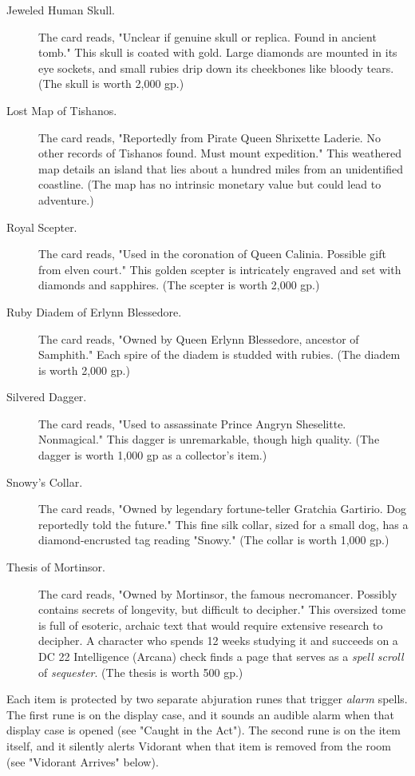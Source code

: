\documentclass[10pt,a4paper,twoside,bg=print,twocolumn,openany,nodeprecatedcode]{dndbook}
\begin{document}
\begin{description}
\item[Jeweled Human Skull.]
The card reads, "Unclear if genuine skull or replica. Found in ancient tomb." This skull is coated with gold. Large diamonds are mounted in its eye sockets, and small rubies drip down its cheekbones like bloody tears. (The skull is worth 2,000 gp.)
\item[Lost Map of Tishanos.]
The card reads, "Reportedly from Pirate Queen Shrixette Laderie. No other records of Tishanos found. Must mount expedition." This weathered map details an island that lies about a hundred miles from an unidentified coastline. (The map has no intrinsic monetary value but could lead to adventure.)
\item[Royal Scepter.]
The card reads, "Used in the coronation of Queen Calinia. Possible gift from elven court." This golden scepter is intricately engraved and set with diamonds and sapphires. (The scepter is worth 2,000 gp.)
\item[Ruby Diadem of Erlynn Blessedore.]
The card reads, "Owned by Queen Erlynn Blessedore, ancestor of Samphith." Each spire of the diadem is studded with rubies. (The diadem is worth 2,000 gp.)
\item[Silvered Dagger.]
The card reads, "Used to assassinate Prince Angryn Sheselitte. Nonmagical." This dagger is unremarkable, though high quality. (The dagger is worth 1,000 gp as a collector's item.)
\item[Snowy's Collar.]
The card reads, "Owned by legendary fortune-teller Gratchia Gartirio. Dog reportedly told the future." This fine silk collar, sized for a small dog, has a diamond-encrusted tag reading "Snowy." (The collar is worth 1,000 gp.)
\item[Thesis of Mortinsor.]
The card reads, "Owned by Mortinsor, the famous necromancer. Possibly contains secrets of longevity, but difficult to decipher." This oversized tome is full of esoteric, archaic text that would require extensive research to decipher. A character who spends 12 weeks studying it and succeeds on a DC 22 Intelligence (Arcana) check finds a page that serves as a \textit{spell scroll} of \textit{sequester}. (The thesis is worth 500 gp.)
\end{description}

Each item is protected by two separate abjuration runes that trigger \textit{alarm} spells. The first rune is on the display case, and it sounds an audible alarm when that display case is opened (see "Caught in the Act"). The second rune is on the item itself, and it silently alerts Vidorant when that item is removed from the room (see "Vidorant Arrives" below).
\end{document}

